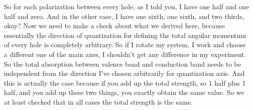 So for each polarization between every hole, as I told you, I have one half and one half and zero. And in the other case, I have one sixth, one sixth, and two thirds, okay? Now we need to make a check about what we derived here, because essentially the direction of quantization for defining the total angular momentum of every hole is completely arbitrary. So if I rotate my system, I work and choose a different one of the main axes, I shouldn't get any difference in my experiment. So the total absorption between valence band and conduction band needs to be independent from the direction I've chosen arbitrarily for quantization axis. And this is actually the case because if you add up the total strength, so 1 half plus 1 half, and you add up these two things, you exactly obtain the same value. So we at least checked that in all cases the total strength is the same.






